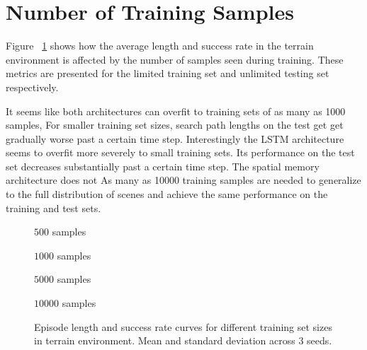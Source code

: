 \section{Number of Training Samples}
\label{sec:sample}

Figure ~\ref{fig:sample} shows how the average length and success rate in the terrain environment is affected by the number of samples seen during training.
These metrics are presented for the limited training set and unlimited testing set respectively.

It seems like both architectures can overfit to training sets of as many as 1000 samples,
For smaller training set sizes, search path lengths on the test get get gradually worse past a certain time step.
Interestingly the LSTM architecture seems to overfit more severely to small training sets.
Its performance on the test set decreases substantially past a certain time step.
The spatial memory architecture does not 
As many as 10000 training samples are needed to generalize to the full distribution of scenes and achieve the same performance on the training and test sets. 

\begin{figure}
    \centering
    \(500\) samples
    
    \(1000\) samples
    
    \(5000\) samples
    
    \(10000\) samples
    
    \label{fig:sample}
    \caption[Learning curves for varying training set sizes.]{Episode length and success rate curves for different training set sizes in terrain environment. Mean and standard deviation across 3 seeds.}
\end{figure}
